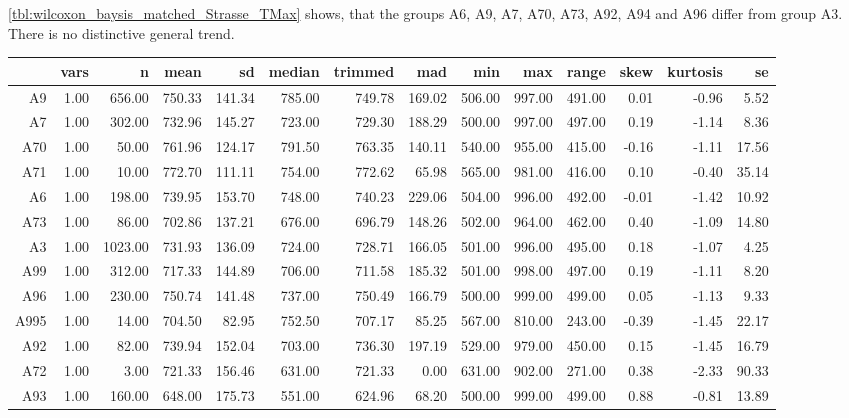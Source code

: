 \cref{tbl:wilcoxon_baysis_matched_Strasse_TMax} shows, that the groups A6, A9, A7, A70, A73, A92, A94 and A96 differ from group A3. There is no distinctive general trend.
\begin{table}[ht!]
	\tiny
	\centering
  \begin{tabular}{rrrrrrrrrrrrrr}
    \hline
    & vars & n & mean & sd & median & trimmed & mad & min & max & range & skew & kurtosis & se \\ 
    \hline
    A9   & 1.00 & 656.00 & 750.33 & 141.34 & 785.00 & 749.78 & 169.02 & 506.00 & 997.00 & 491.00 & 0.01 & -0.96 & 5.52 \\ 
    A7   & 1.00 & 302.00 & 732.96 & 145.27 & 723.00 & 729.30 & 188.29 & 500.00 & 997.00 & 497.00 & 0.19 & -1.14 & 8.36 \\ 
    A70  & 1.00 & 50.00 & 761.96 & 124.17 & 791.50 & 763.35 & 140.11 & 540.00 & 955.00 & 415.00 & -0.16 & -1.11 & 17.56 \\ 
    A71  & 1.00 & 10.00 & 772.70 & 111.11 & 754.00 & 772.62 & 65.98 & 565.00 & 981.00 & 416.00 & 0.10 & -0.40 & 35.14 \\ 
    A6   & 1.00 & 198.00 & 739.95 & 153.70 & 748.00 & 740.23 & 229.06 & 504.00 & 996.00 & 492.00 & -0.01 & -1.42 & 10.92 \\ 
    A73  & 1.00 & 86.00 & 702.86 & 137.21 & 676.00 & 696.79 & 148.26 & 502.00 & 964.00 & 462.00 & 0.40 & -1.09 & 14.80 \\ 
    A3   & 1.00 & 1023.00 & 731.93 & 136.09 & 724.00 & 728.71 & 166.05 & 501.00 & 996.00 & 495.00 & 0.18 & -1.07 & 4.25 \\ 
    A99  & 1.00 & 312.00 & 717.33 & 144.89 & 706.00 & 711.58 & 185.32 & 501.00 & 998.00 & 497.00 & 0.19 & -1.11 & 8.20 \\ 
    A96  & 1.00 & 230.00 & 750.74 & 141.48 & 737.00 & 750.49 & 166.79 & 500.00 & 999.00 & 499.00 & 0.05 & -1.13 & 9.33 \\ 
    A995 & 1.00 & 14.00 & 704.50 & 82.95 & 752.50 & 707.17 & 85.25 & 567.00 & 810.00 & 243.00 & -0.39 & -1.45 & 22.17 \\ 
    A92  & 1.00 & 82.00 & 739.94 & 152.04 & 703.00 & 736.30 & 197.19 & 529.00 & 979.00 & 450.00 & 0.15 & -1.45 & 16.79 \\ 
    A72  & 1.00 & 3.00 & 721.33 & 156.46 & 631.00 & 721.33 & 0.00 & 631.00 & 902.00 & 271.00 & 0.38 & -2.33 & 90.33 \\ 
    A93  & 1.00 & 160.00 & 648.00 & 175.73 & 551.00 & 624.96 & 68.20 & 500.00 & 999.00 & 499.00 & 0.88 & -0.81 & 13.89 \\ 

\end{tabular}
\end{table}
